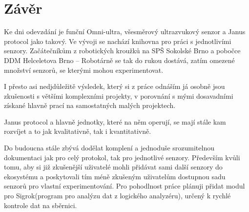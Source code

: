 \newpage
\chapter*{Závěr}

Ke dni odevzdání je funční Omni-ultra, všesměrový ultrazvukový senzor a Janus protocol jako takový.
Ve vývoji se nachází knihovna pro práci s jednotlivími senzory.
Začátečníkům z robotických kroužků na SPŠ Sokolské Brno a pobočce DDM Helceletova Brno -- Robotárně se tak do rukou dostává, zatím omezené množství senzorů, se kterými mohou experimentovat.

I přesto asi nedjdůležitě výsledek, který si z práce odnáším já osobně jsou zkušenosti s většími komplexními projekty, v porovnání s mými dosavadními získané hlavně prací na samostatných malých projektech.

Janus protocol a hlavně jednotky, které na něm operují, se mají stále kam rozvíjet a to jak kvalitativně, tak i kvantitativně.

Do budoucna stále zbývá dodělat komplení a jednoduše srozumitelnou dokumentaci jak pro celý protokol, tak pro jednotlivé senzory.
Především kvůli tomu, aby si již zkušenější uživatelé mohli přidávat sami další senzory do ekosystému a poskytovali tím méně zkušeným uživatelům dostupnou sadu senzorů pro vlastní experimentování.
Pro pohodlnost práce plánuji přidat modul pro Sigrok(program pro analýzu dat z logického analyzéru), určený k rychlé kontrole dat na sběrnici.
